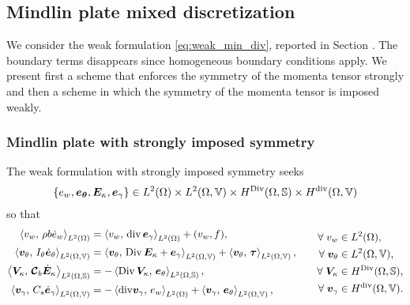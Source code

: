 \subsection{Mindlin plate mixed discretization}
We consider the weak formulation \eqref{eq:weak_min_div}, reported in Section . The boundary terms disappears since homogeneous boundary conditions apply. We present first a scheme that enforces the symmetry of the momenta tensor strongly and then a scheme in which the symmetry of the momenta tensor is imposed weakly.

\subsubsection{Mindlin plate with strongly imposed symmetry}\label{sec:min_strong}
The weak formulation with strongly imposed symmetry seeks 
$$\{e_w, \bm{e}_{\bm{\theta}}, \bm{E}_{\kappa}, \bm{e}_{\gamma}\} \in L^2(\Omega) \times L^2(\Omega, \mathbb{V}) \times H^{\operatorname*{Div}}(\Omega, \mathbb{S}) \times H^{\operatorname{div}}(\Omega, \mathbb{V})$$
 so that 
\begin{equation}
\label{eq:weak_min_PH_strong}
\begin{aligned}
\inner[L^2(\Omega)]{v_w}{\rho b \dot{e}_w} &= \inner[L^2(\Omega)]{v_w}{\div \bm{e}_\gamma} + (v_w, f), \\ 
\inner[L^2(\Omega, \mathbb{V})]{\bm{v}_\theta}{I_\theta \dot{\bm{e}}_\theta} &= \inner[L^2(\Omega, \mathbb{V})]{\bm{v}_\theta}{\Div \bm{E}_\kappa + \bm{e}_\gamma} + \inner[L^2(\Omega, \mathbb{V})]{\bm{v}_\theta}{\bm{\tau}}, \\  
\inner[L^2(\Omega, \mathbb{S})]{\bm{V}_\kappa}{\bm{\mathcal{C}}_{b} \dot{\bm{E}}_\kappa} &= -\inner[L^2(\Omega, \mathbb{S})]{\Div \bm{V}_\kappa}{\bm{e}_\theta}, \\ 
\inner[L^2(\Omega, \mathbb{V})]{\bm{v}_\gamma}{C_s \dot{\bm{e}}_\gamma} &= -\inner[L^2(\Omega)]{\mathrm{div} \bm{v}_\gamma}{e_w} + \inner[L^2(\Omega, \mathbb{V})]{\bm{v}_\gamma}{\bm{e}_{\theta}}, \\ 
\end{aligned} \qquad
\begin{aligned}
\forall\; v_w &\in L^2(\Omega), \\
\forall\; \bm{v}_\theta &\in L^2(\Omega, \mathbb{V}), \\
\forall\; \bm{V}_\kappa &\in H^{\Div}(\Omega, \mathbb{S}), \\
\forall\; \bm{v}_\gamma &\in H^{\div}(\Omega, \mathbb{V}).
\end{aligned}
\end{equation}

